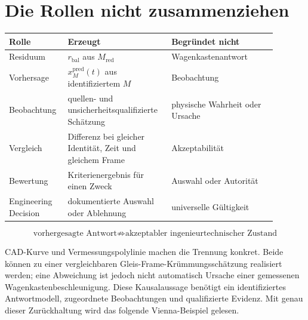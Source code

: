 \section{Die Rollen nicht zusammenziehen}

\begin{center}
\small
\begin{tabular}{p{0.19\linewidth}p{0.33\linewidth}p{0.37\linewidth}}
\toprule
Rolle & Erzeugt & Begründet nicht\\
\midrule
Residuum & \(r_{\mathrm{bal}}\) aus \(M_{\mathrm{red}}\) & Wagenkastenantwort\\
Vorhersage & \(x_M^{\mathrm{pred}}(t)\) aus identifiziertem \(M\) & Beobachtung\\
Beobachtung & quellen- und unsicherheitsqualifizierte Schätzung & physische Wahrheit oder Ursache\\
Vergleich & Differenz bei gleicher Identität, Zeit und gleichem Frame & Akzeptabilität\\
Bewertung & Kriterienergebnis für einen Zweck & Auswahl oder Autorität\\
Engineering Decision & dokumentierte Auswahl oder Ablehnung & universelle Gültigkeit\\
\bottomrule
\end{tabular}
\end{center}

\[
\boxed{\text{vorhergesagte Antwort}
\not\Rightarrow \text{akzeptabler ingenieurtechnischer Zustand}}
\]

CAD-Kurve und Vermessungspolylinie machen die Trennung konkret. Beide können
zu einer vergleichbaren Gleis-Frame-Krümmungsschätzung realisiert werden;
eine Abweichung ist jedoch nicht automatisch Ursache einer gemessenen
Wagenkastenbeschleunigung. Diese Kausalaussage benötigt ein identifiziertes
Antwortmodell, zugeordnete Beobachtungen und qualifizierte Evidenz. Mit genau
dieser Zurückhaltung wird das folgende Vienna-Beispiel gelesen.
